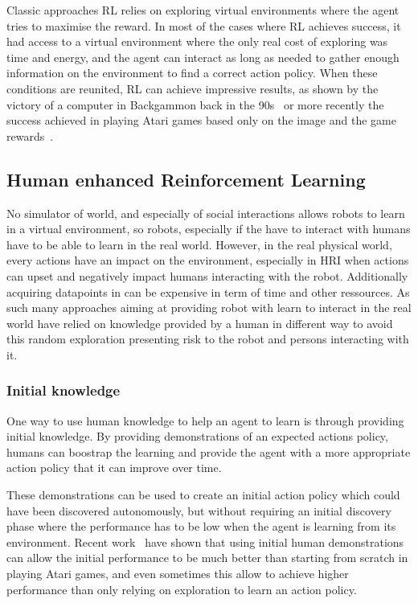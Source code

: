 \documentclass[letterpaper]{article} %
\begin{document}
Classic approaches RL relies on exploring virtual environments where the agent
tries to maximise the reward. In most of the cases where RL achieves success, it
had access to a virtual environment where the only real cost of exploring was
time and energy, and the agent can interact as long as needed to gather
enough information on the environment to find a correct action policy. When
these conditions are reunited, RL can achieve impressive results, as shown by
the victory of a computer in Backgammon back in the 90s~\cite{tesauro1995temporal} or more recently the success achieved in playing
Atari games based only on the image and the game rewards~\cite{mnih2015human}.

\subsection{Human enhanced Reinforcement Learning}

No simulator of world, and especially of social interactions allows robots to 
learn in a virtual environment, so robots, especially if the have to interact
with humans have to be able to learn in the real world.
However, in the real physical world, every actions have an impact on the
environment, especially in HRI when actions can upset and negatively impact
humans interacting with the robot. Additionally acquiring datapoints in can be
expensive in term of time and other ressources. As such many approaches aiming
at providing robot with learn to interact in the real world have relied on
knowledge provided by a human in different way to avoid this random exploration
presenting risk to the robot and persons interacting with it.

\subsubsection{Initial knowledge}
One way to use human knowledge to help an agent to learn is through providing
initial knowledge. By providing demonstrations of an expected actions policy,
humans can boostrap the learning and provide the agent with a more appropriate
action policy that it can improve over time. 

These demonstrations can be used to create an initial action policy which could
have been discovered autonomously, but without requiring an initial discovery
phase where the performance has to be low when the agent is learning from its
environment. Recent work~\cite{hester2017learning} have shown that using initial
human demonstrations can allow the initial performance to be much better than
starting from scratch in playing Atari games, and even sometimes this allow to
achieve higher performance than only relying on exploration to learn an action
policy.
\end{document}
